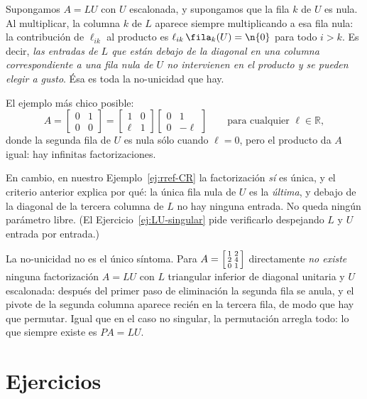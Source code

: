 Supongamos $A=LU$ con $U$ escalonada, y supongamos que la fila $k$ de $U$ es
nula. Al multiplicar, la columna $k$ de $L$ aparece siempre multiplicando a esa
fila nula: la contribución de $\ell_{ik}$ al producto es $\ell_{ik}\,\fila_k(U)
= \n{0}$ para todo $i>k$. Es decir, \emph{las entradas de $L$ que están debajo
de la diagonal en una columna correspondiente a una fila nula de $U$ no
intervienen en el producto y se pueden elegir a gusto}. Ésa es toda la
no-unicidad que hay.

El ejemplo más chico posible:
\[
A = \begin{bmatrix} 0 & 1\\ 0 & 0\end{bmatrix}
= \begin{bmatrix} 1 & 0\\ \ell & 1\end{bmatrix}
  \begin{bmatrix} 0 & 1\\ 0 & -\ell\end{bmatrix}
\qquad\text{para cualquier } \ell\in\mathbb{R},
\]
donde la segunda fila de $U$ es nula sólo cuando $\ell=0$, pero el producto da
$A$ igual: hay infinitas factorizaciones.

En cambio, en nuestro Ejemplo~\ref{ej:rref-CR} la factorización \emph{sí} es
única, y el criterio anterior explica por qué: la única fila nula de $U$ es la
\emph{última}, y debajo de la diagonal de la tercera columna de $L$ no hay
ninguna entrada. No queda ningún parámetro libre. (El
Ejercicio~\ref{ej:LU-singular} pide verificarlo despejando $L$ y $U$ entrada
por entrada.)

\begin{remark}
La no-unicidad no es el único síntoma. Para
$A = \begin{bsmallmatrix} 1&2\\ 2&4\\ 0&1\end{bsmallmatrix}$ directamente
\emph{no existe} ninguna factorización $A=LU$ con $L$ triangular inferior de
diagonal unitaria y $U$ escalonada: después del primer paso de eliminación la
segunda fila se anula, y el pivote de la segunda columna aparece recién en la
tercera fila, de modo que hay que permutar. Igual que en el caso no singular,
la permutación arregla todo: lo que siempre existe es $PA=LU$.
\end{remark}

\section{Ejercicios}

